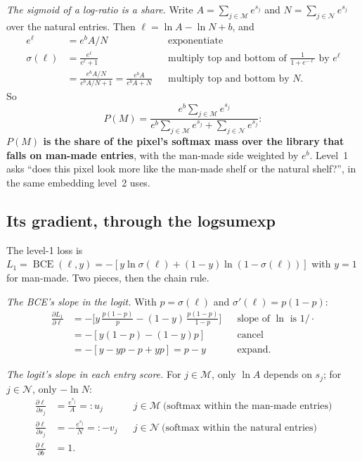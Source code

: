 \emph{The sigmoid of a log-ratio is a share.} Write $A=\sum_{j\in\mathcal{M}}e^{s_j}$ and
$N=\sum_{j\in\mathcal{N}}e^{s_j}$ over the natural entries. Then $\ell=\ln A-\ln N+b$, and
\begin{align*}
e^{\ell} &= e^{b}A/N &&\text{exponentiate}\\
\sigma(\ell) &= \frac{e^{\ell}}{e^{\ell}+1} &&\text{multiply top and bottom of }\tfrac{1}{1+e^{-\ell}}\text{ by }e^{\ell}\\
&= \frac{e^{b}A/N}{e^{b}A/N+1} = \frac{e^{b}A}{e^{b}A+N} &&\text{multiply top and bottom by }N .
\end{align*}
So
\begin{equation}
P(M)=\frac{e^{b}\sum_{j\in\mathcal{M}}e^{s_j}}{e^{b}\sum_{j\in\mathcal{M}}e^{s_j}+\sum_{j\in\mathcal{N}}e^{s_j}} :
\label{eq:namer:l1share}
\end{equation}
\textbf{$P(M)$ is the share of the pixel's softmax mass over the library that falls on man-made entries}, with the
man-made side weighted by $e^{b}$. Level~1 asks ``does this pixel look more like the man-made shelf or the natural
shelf?'', in the same embedding level~2 uses.

\subsection{Its gradient, through the logsumexp}

The level-1 loss is $L_1=\operatorname{BCE}(\ell,y)=-[y\ln\sigma(\ell)+(1-y)\ln(1-\sigma(\ell))]$ with $y=1$ for
man-made. Two pieces, then the chain rule.

\emph{The BCE's slope in the logit.} With $p=\sigma(\ell)$ and $\sigma'(\ell)=p(1-p)$:
\begin{align*}
\frac{\partial L_1}{\partial\ell} &= -\Big[y\,\frac{p(1-p)}{p}-(1-y)\,\frac{p(1-p)}{1-p}\Big] &&\text{slope of }\ln\text{ is }1/\cdot\\
&= -[y(1-p)-(1-y)p] &&\text{cancel}\\
&= -[y-yp-p+yp] = p-y &&\text{expand.}
\end{align*}

\emph{The logit's slope in each entry score.} For $j\in\mathcal{M}$, only $\ln A$ depends on $s_j$; for
$j\in\mathcal{N}$, only $-\ln N$:
\begin{align*}
\frac{\partial\ell}{\partial s_j} &= \frac{e^{s_j}}{A}=:u_j &&j\in\mathcal{M}\ \text{(softmax within the man-made entries)}\\
\frac{\partial\ell}{\partial s_j} &= -\frac{e^{s_j}}{N}=:-v_j &&j\in\mathcal{N}\ \text{(softmax within the natural entries)}\\
\frac{\partial\ell}{\partial b} &= 1 .
\end{align*}


